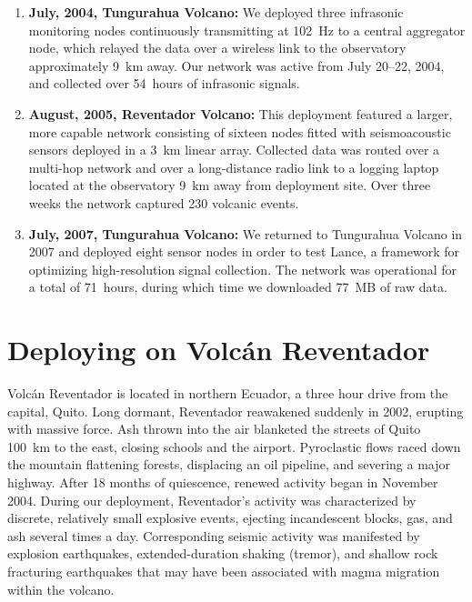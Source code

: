 \begin{enumerate}

\item \textbf{July, 2004, Tungurahua Volcano:} We deployed three infrasonic
monitoring nodes continuously transmitting at 102~Hz to a central aggregator
node, which relayed the data over a wireless link to the observatory
approximately 9~km away.  Our network was active from July 20--22, 2004, and
collected over 54~hours of infrasonic signals.

\item \textbf{August, 2005, Reventador Volcano:} This deployment featured a larger,
more capable network consisting of sixteen nodes fitted with seismoacoustic
sensors deployed in a 3~km linear array.  Collected data was routed over a
multi-hop network and over a long-distance radio link to a logging laptop
located at the observatory 9~km away from deployment site.  Over three weeks
the network captured 230 volcanic events.

\item \textbf{July, 2007, Tungurahua Volcano:} We returned to Tungurahua Volcano in
2007 and deployed eight sensor nodes in order to test Lance, a framework for
optimizing high-resolution signal collection. The network was operational for
a total of 71~hours, during which time we downloaded 77~MB of raw data.

\end{enumerate}

\section{Deploying on Volc\'{a}n Reventador}

Volc\'{a}n Reventador is located in northern Ecuador, a three hour drive from
the capital, Quito.  Long dormant, Reventador reawakened suddenly in 2002,
erupting with massive force.  Ash thrown into the air blanketed the streets
of Quito 100~km to the east, closing schools and the airport.  Pyroclastic
flows raced down the mountain flattening forests, displacing an oil pipeline,
and severing a major highway.  After 18 months of quiescence, renewed
activity began in November 2004.  During our deployment, Reventador's
activity was characterized by discrete, relatively small explosive events,
ejecting incandescent blocks, gas, and ash several times a day.
Corresponding seismic activity was manifested by explosion earthquakes,
extended-duration shaking (tremor), and shallow rock fracturing earthquakes
that may have been associated with magma migration within the volcano.

